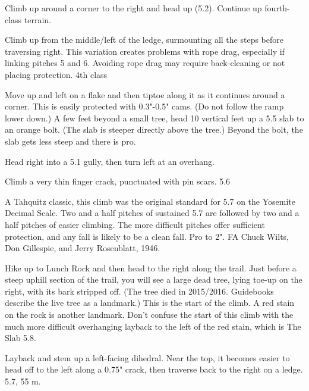 \documentclass{tahquitz}
\begin{document}
 Climb up around a corner to the right and head up (5.2).
Continue up fourth-class terrain.

 Climb up from the middle/left of the ledge, surmounting all the steps
before traversing right. This variation creates problems with rope drag, especially
if linking pitches 5 and 6. Avoiding rope drag may require back-cleaning or not
placing protection. 4th class

 Move up and left on a flake and then tiptoe along it as it
continues around a corner.  This is easily protected with 0.3"-0.5"
cams. (Do not follow the ramp lower down.)  A few feet beyond a small
tree, head 10 vertical feet up a 5.5 slab to an orange bolt. (The slab
is steeper directly above the tree.) Beyond the bolt, the slab gets
less steep and there is pro. 

 Head right into a 5.1 gully, then turn left at an overhang.

 Climb a very thin finger crack, punctuated with pin scars. 5.6

\somespace

\upfriction




A Tahquitz classic, this climb was the original standard for 5.7 on the Yosemite Decimal
Scale. Two and a half pitches of sustained 5.7 are followed by two and a half pitches
of easier climbing. The more difficult pitches offer sufficient protection, and any fall
is likely to be a clean fall. Pro to 2".
FA Chuck Wilts, Don Gillespie, and Jerry Rosenblatt, 1946.

Hike up to Lunch Rock and then head to the right along the
trail. Just before a steep uphill section of the trail, you
will see a large dead tree, lying toe-up on the right, with its
bark stripped off. (The tree died in 2015/2016.
Guidebooks describe the live tree as a landmark.) This
is the start of the climb. A red stain on the rock is another
landmark. Don't confuse the start of this climb with the much more
difficult overhanging layback to the left of the red stain,
which is The Slab 5.8.

\somespace

 Layback and stem up a left-facing dihedral. Near the top, it becomes easier to
head off to the left along a 0.75" crack, then traverse back to the right
on a ledge. 5.7, 55 m.
\end{document}
